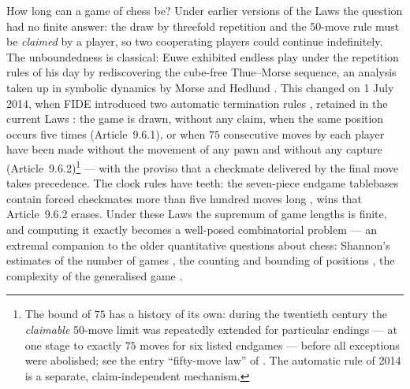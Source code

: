 \documentclass[11pt]{article}
\theoremstyle{definition}
\theoremstyle{remark}
\theoremstyle{plain}
\begin{document}
How long can a game of chess be? Under earlier versions of the Laws the
question had no finite answer: the draw by threefold repetition and the
50-move rule must be \emph{claimed} by a player, so two cooperating players
could continue indefinitely. The unboundedness is classical: Euwe
\cite{euwe1929} exhibited endless play under the repetition rules of his
day by rediscovering the cube-free Thue--Morse sequence, an analysis
taken up in symbolic dynamics by Morse and Hedlund
\cite{morsehedlund1944}. This changed on 1 July 2014, when FIDE
introduced two automatic termination rules \cite{fide2014laws}, retained in
the current Laws \cite{fide2023laws}: the game is drawn, without any claim, when the same
position occurs five times (Article~9.6.1), or when $75$ consecutive moves
by each player have been made without the movement of any pawn and without
any capture (Article~9.6.2)\footnote{The bound of $75$ has a history of
its own: during the twentieth century the \emph{claimable} 50-move limit
was repeatedly extended for particular endings --- at one stage to
exactly $75$ moves for six listed endgames --- before all exceptions
were abolished; see the entry ``fifty-move law'' of \cite{hooperwhyld}.
The automatic rule of 2014 is a separate, claim-independent mechanism.}
--- with the proviso that a checkmate delivered
by the final move takes precedence. The clock rules have teeth: the
seven-piece endgame tablebases \cite{lomonosov2019} contain forced
checkmates more than five hundred moves long \cite{top8dtm}, wins that
Article~9.6.2 erases. Under these Laws the supremum of game
lengths is finite, and computing it exactly becomes a well-posed
combinatorial problem --- an extremal companion to the older
quantitative questions about chess: Shannon's estimates of the number of
games \cite{shannon1950}, the counting and bounding of positions
\cite{steinerberger2015,gourion2022,tromppositions}, the complexity of
the generalised game \cite{fraenkel1981}.
\end{document}
